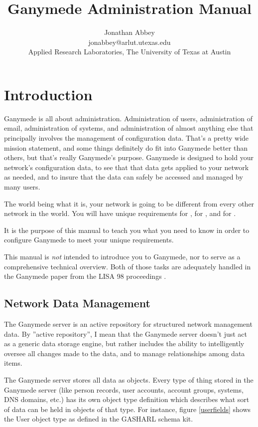 \documentclass{book}
\title{Ganymede Administration Manual}
\author{Jonathan Abbey\\jonabbey@arlut.utexas.edu\\Applied Research
Laboratories, The University of Texas at Austin}
\begin{document}
\maketitle
\tableofcontents
\chapter{Introduction}
Ganymede is all about administration.  Administration of users,
administration of email, administration of systems, and administration
of almost anything else that principally involves the management of
configuration data. That's a pretty wide mission statement, and some
things definitely do fit into Ganymede better than others, but that's
really Ganymede's purpose.  Ganymede is designed to hold your
network's configuration data, to see that that data gets applied to
your network as needed, and to insure that the data can safely be
accessed and managed by many users.

The world being what it is, your network is going to be different from
every other network in the world.  You will have unique requirements
for ,
for , and for .

It is the purpose of this manual to teach you what you need to know in
order to configure Ganymede to meet your unique requirements.

This manual is \emph{not} intended to introduce you to Ganymede, nor
to serve as a comprehensive technical overview.  Both of those tasks
are adequately handled in the Ganymede paper from the LISA 98
proceedings \cite{abbey98}.

\section{Network Data Management}

The Ganymede server is an active repository for structured network
management data.  By ''active repository'', I mean that the Ganymede
server doesn't just act as a generic data storage engine, but rather
includes the ability to intelligently oversee all changes made to the
data, and to manage relationships among data items.

The Ganymede server stores all data as objects.  Every type of thing
stored in the Ganymede server (like person records, user accounts,
account groups, systems, DNS domains, etc.) has its own object type
definition which describes what sort of data can be held in objects of
that type.  For instance, figure \ref{userfields} shows the User
object type as defined in the GASHARL schema kit.
\end{document}
